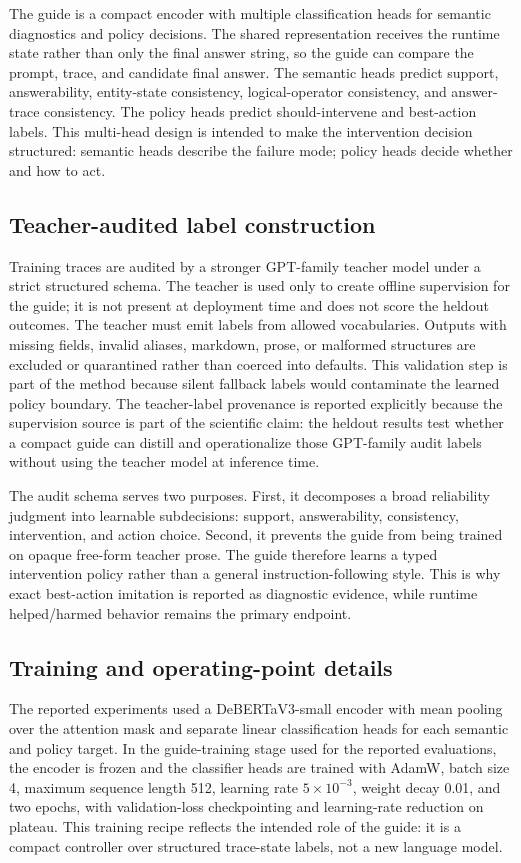 \documentclass[11pt]{article}
\begin{document}
The guide is a compact encoder with multiple classification heads for semantic diagnostics and policy decisions. The shared representation receives the runtime state rather than only the final answer string, so the guide can compare the prompt, trace, and candidate final answer. The semantic heads predict support, answerability, entity-state consistency, logical-operator consistency, and answer-trace consistency. The policy heads predict should-intervene and best-action labels. This multi-head design is intended to make the intervention decision structured: semantic heads describe the failure mode; policy heads decide whether and how to act.

\subsection{Teacher-audited label construction}
Training traces are audited by a stronger GPT-family teacher model under a strict structured schema. The teacher is used only to create offline supervision for the guide; it is not present at deployment time and does not score the heldout outcomes. The teacher must emit labels from allowed vocabularies. Outputs with missing fields, invalid aliases, markdown, prose, or malformed structures are excluded or quarantined rather than coerced into defaults. This validation step is part of the method because silent fallback labels would contaminate the learned policy boundary. The teacher-label provenance is reported explicitly because the supervision source is part of the scientific claim: the heldout results test whether a compact guide can distill and operationalize those GPT-family audit labels without using the teacher model at inference time.

The audit schema serves two purposes. First, it decomposes a broad reliability judgment into learnable subdecisions: support, answerability, consistency, intervention, and action choice. Second, it prevents the guide from being trained on opaque free-form teacher prose. The guide therefore learns a typed intervention policy rather than a general instruction-following style. This is why exact best-action imitation is reported as diagnostic evidence, while runtime helped/harmed behavior remains the primary endpoint.


\subsection{Training and operating-point details}
The reported experiments used a DeBERTaV3-small encoder with mean pooling over the attention mask and separate linear classification heads for each semantic and policy target. In the guide-training stage used for the reported evaluations, the encoder is frozen and the classifier heads are trained with AdamW, batch size 4, maximum sequence length 512, learning rate \(5\times10^{-3}\), weight decay 0.01, and two epochs, with validation-loss checkpointing and learning-rate reduction on plateau. This training recipe reflects the intended role of the guide: it is a compact controller over structured trace-state labels, not a new language model.
\end{document}
